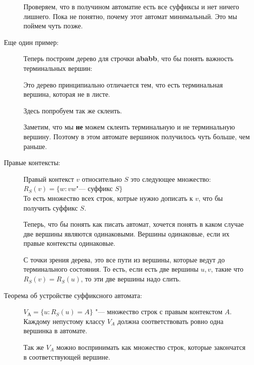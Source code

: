\begin{description}
    Проверяем, что в получином автоматие есть все суффиксы и нет ничего лишнего. 
    Пока не понятно, почему этот автомат минимальный.  Это мы поймем чуть позже.
    \item[Еще один пример:]
    
    Теперь построим дерево для строчки \textbf{ababb}, что бы понять важность терминальных вершин:
    

    Это дерево принципиально отличается тем, что есть терминальная вершина, которая не в листе.

    Здесь попробуем так же склеить.
    

    Заметим, что мы \textbf{не} можем склеить терминальную и не терминальную вершину. Поэтому в этом 
    автомате вершинок получилось чуть больше, чем раньше. 
    
    \item[Правые контексты:]
    \begin{Def}
    Правый контекст $v$ относительно $S$ это следующее множество:\\
    $R_S(v) = \{w: vw $"--- суффикс $S\}$ \\
    То есть множество всех строк,  котрые нужно дописать к $v$, что бы  получить суффикс $S$.
    \end{Def}

    Теперь, что бы понять как писать автомат, хочется понять в каком случае две вершины являются одинаковыми. 
    Вершины одинаковые, если их правые контексты одинаковые. 

    С точки зрения дерева, это все пути из вершины, которые ведут до терминального состояния. То есть, 
    если есть две вершины $u, v$, такие что $R_S(v) = R_S(u)$, то эти две вершины надо слить.
    
    \item[Теорема об устройстве суффиксного автомата:]
    \begin{theorem}
    $V_А = \{u \colon R_S(u) = A\}$ "--- множество строк с правым контекстом $A$.\\
    Каждому непустому классу $V_A$ должна соответствовать ровно одна вершинка в автомате. 
    \end{theorem}

    Так же $V_A$ можно воспринимать как множество строк, которые закончатся в соответствующей вершине. 
    

\end{description}
